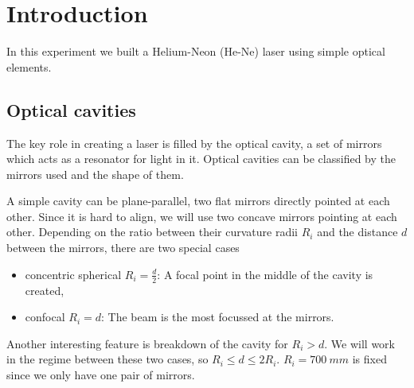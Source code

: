 \section{Introduction}
\label{sec:introduction}
In this experiment we built a Helium-Neon (He-Ne) laser using simple optical elements.

\subsection{Optical cavities}
\label{sec:Optical cavities}
The key role in creating a laser is filled by the optical cavity, a set of mirrors which acts as a
resonator for light in it. Optical cavities can be classified by the mirrors used and the shape of
them.

A simple cavity can be plane-parallel, two flat mirrors directly pointed at each other. Since it is
hard to align, we will use two concave mirrors pointing at each other. Depending on the ratio
between their curvature radii $R_i$ and the distance $d$ between the mirrors, there are two special
cases
\begin{itemize}
  \item concentric spherical $R_i = \frac{d}{2}$: A focal point in the middle of the cavity is
    created,
  \item confocal $R_i = d$: The beam is the most focussed at the mirrors.
\end{itemize}
Another interesting feature is breakdown of the cavity for $R_i > d$. We will work in the regime between 
these two cases, so $R_i \leq d \leq 2R_i$. $R_i=\SI{700}{mm}$ is fixed since we only have one pair 
of mirrors.

